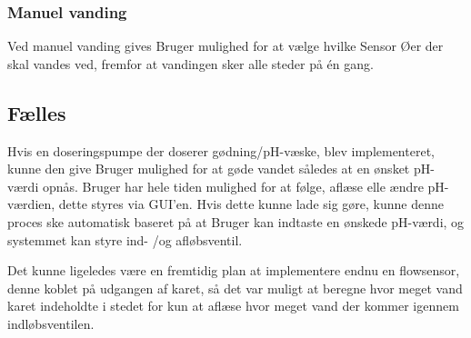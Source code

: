\subsubsection{Manuel vanding}
Ved manuel vanding gives Bruger mulighed for at vælge hvilke Sensor Øer der skal vandes ved, fremfor at vandingen sker alle steder på én gang.\newline 

\subsection{Fælles}
Hvis en doseringspumpe der doserer gødning/pH-væske, blev implementeret, kunne den give Bruger mulighed for at gøde vandet således at en ønsket pH-værdi opnås. Bruger har hele tiden mulighed for at følge, aflæse elle ændre pH-værdien, dette styres via GUI'en. Hvis dette kunne lade sig gøre, kunne denne proces ske automatisk baseret på at Bruger kan indtaste en ønskede pH-værdi, og systemmet kan styre ind- /og afløbsventil.\newline

Det kunne ligeledes være en fremtidig plan at implementere endnu en flowsensor, denne koblet på udgangen af karet, så det var muligt at beregne hvor meget vand karet indeholdte i stedet for kun at aflæse hvor meget vand der kommer igennem indløbsventilen. 